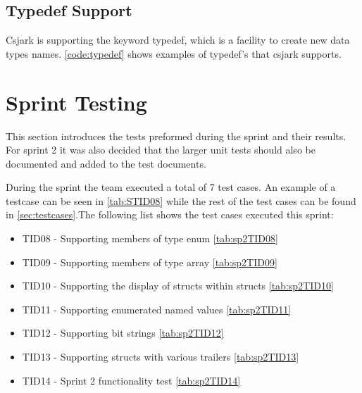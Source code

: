 

\subsection{Typedef Support}
Csjark is supporting the keyword typedef, which is a facility to create new 
data types names. \autoref{code:typedef} shows examples of typedef's that 
csjark supports.



\section{Sprint Testing}
\label{sec:sp2:test}
This section introduces the tests preformed during the sprint and their results. For sprint 2 it was also decided that the larger unit tests should also be documented and added to the test documents.

During the sprint the team executed a total of 7 test cases. An example of a testcase can be seen in \autoref{tab:STID08} while the rest of the  test cases can be found in \autoref{sec:testcases}.The following list shows the test cases executed this sprint:
\begin{itemize}
	\item TID08 - Supporting \glspl{member} of type \gls{enum} \autoref{tab:sp2TID08}
	\item TID09 - Supporting \glspl{member} of type \gls{array}  \autoref{tab:sp2TID09}
	\item TID10 - Supporting the display of \glspl{struct} within \glspl{struct}  \autoref{tab:sp2TID10}
	\item TID11 - Supporting \glspl{enumerated named value}  \autoref{tab:sp2TID11}
	\item TID12 - Supporting \glspl{bit string}  \autoref{tab:sp2TID12}
	\item TID13 - Supporting \glspl{struct} with various \gls{trailers} \autoref{tab:sp2TID13}
	\item TID14 - Sprint 2 functionality test \autoref{tab:sp2TID14}
\end{itemize}

